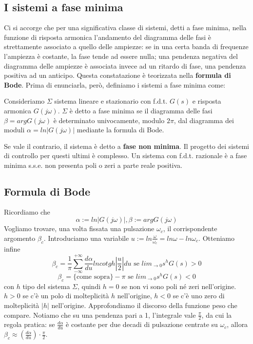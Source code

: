 \documentclass[11pt]{article}
\begin{document}
\subsection{I sistemi a fase minima}
Ci si accorge che per una significativa classe di sistemi, detti a fase minima, nella funzione di risposta armonica l'andamento del diagramma delle fasi è strettamente associato a quello delle ampiezze: se in una certa banda di frequenze l'ampiezza è costante, la fase tende ad essere nulla; una pendenza negativa del diagramma delle ampiezze è associata invece ad un ritardo di fase, una pendenza positiva ad un anticipo.
Questa constatazione è teorizzata nella \textbf{formula di Bode}. Prima di enunciarla, però, definiamo i sistemi a fase minima come:
\begin{center}
    Consideriamo $\Sigma$ sistema lineare e stazionario con f.d.t. $G(s)$ e risposta armonica $G(j\omega)$. $\Sigma$ è detto a fase minima se il diagramma delle fasi $\beta=arg G(j\omega)$ è determinato univocamente, modulo $2\pi$, dal diagramma dei moduli $\alpha = ln|G(j\omega)|$ mediante la formula di Bode.
\end{center}
Se vale il contrario, il sistema è detto a \textbf{fase non minima}. Il progetto dei sistemi di controllo per questi ultimi è complesso. Un sistema con f.d.t. razionale è a fase minima s.s.e. non presenta poli o zeri a parte reale positiva.
\subsection{Formula di Bode}
Ricordiamo che
\begin{displaymath}
    \alpha := ln |G(j\omega)|, \beta := arg G(j\omega)
\end{displaymath}
Vogliamo trovare, una volta fissata una pulsazione $\omega_c$, il corrispondente argomento $\beta_c$. Introduciamo una variabile $u:=ln\frac{\omega}{\omega_c}=ln\omega-ln\omega_c$. Otteniamo infine
\begin{displaymath}
    \beta_c = \frac{1}{\pi} \sum_{-\infty}^{+\infty}\frac{d\alpha}{du}ln cotgh|\frac{u}{2}|du \textrm{ se }lim_{\rightarrow0}s^h G(s)>0
\end{displaymath}
\begin{displaymath}
    \beta_c = \{\textrm{come sopra}\} - \pi \textrm{ se }lim_{\rightarrow0}s^h G(s)<0
\end{displaymath}
con $h$ tipo del sistema $\Sigma$, quindi $h=0$ se non vi sono poli né zeri nell'origine. $h>0$ se c'è un polo di molteplicità $h$ nell'origine, $h<0$ se c'è uno zero di molteplicità $|h|$ nell'origine.
Approfondiamo il discorso della funzione peso che compare. Notiamo che su una pendenza pari a 1, l'integrale vale $\frac{\pi}{2}$, da cui la regola pratica: se $\frac{d\alpha}{du}$ è costante per due decadi di pulsazione centrate su $\omega_c$, allora $\beta_c \approx \left(\frac{d\alpha}{du}\right)\cdot \frac{\pi}{2}$.
\end{document}
